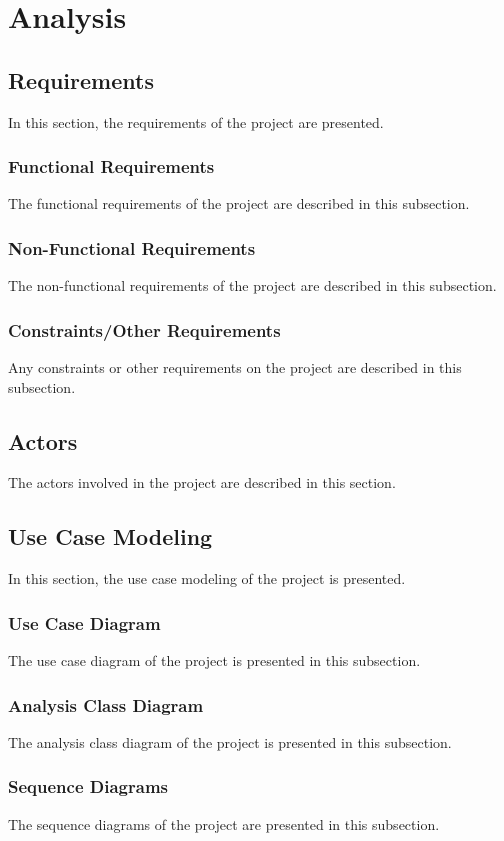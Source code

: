 \chapter{Analysis}

\section{Requirements}

In this section, the requirements of the project are presented.

\subsection{Functional Requirements}

The functional requirements of the project are described in this subsection.

\subsection{Non-Functional Requirements}

The non-functional requirements of the project are described in this subsection.

\subsection{Constraints/Other Requirements}

Any constraints or other requirements on the project are described in this subsection.

\section{Actors}

The actors involved in the project are described in this section.

\section{Use Case Modeling}

In this section, the use case modeling of the project is presented.

\subsection{Use Case Diagram}

The use case diagram of the project is presented in this subsection.

\subsection{Analysis Class Diagram}

The analysis class diagram of the project is presented in this subsection.

\subsection{Sequence Diagrams}

The sequence diagrams of the project are presented in this subsection.

